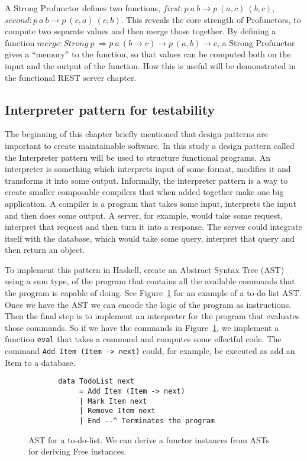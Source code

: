 A Strong Profunctor defines two functions, $first : p\ a\ b\rightarrow p\ (a,c)\
(b,c)$, $second : p\ a\ b\rightarrow p\ (c,a)\ (c,b)$. This reveals the core
strength of Profunctors, to compute two separate values and then merge those
together. By defining a function $merge : Strong\ p\ \Rightarrow p\ a\ (b
\rightarrow c) \rightarrow p\ (a,b) \rightarrow c$, a Strong Profunctor gives a
``memory'' to the function, so that values can be computed both on the input and
the output of the function. How this is useful will be demonstrated in the
functional REST server chapter.

\subsection{Interpreter pattern for testability}\label{interpreterpattern}

The beginning of this chapter briefly mentioned that design patterns are
important to create maintainable software.  In this study a design pattern
called the Interpreter pattern will be used to structure functional programs. An
interpreter is something which interprets input of some format, modifies it and
transforms it into some output.  Informally, the interpreter pattern is a way to
create smaller composable compilers that when added together make one big
application. A compiler is a program that takes some input, interprets the input
and then does some output. A server, for example, would take some request,
interpret that request and then turn it into a response. The server could
integrate itself with the database, which would take some query, interpret that
query and then return an object.~\cite{interpreterpattern}

To implement this pattern in Haskell, create an Abstract Syntax Tree (AST) using
a sum type, of the program that contains all the available commands that the
program is capable of doing. See Figure~\ref{freeunion} for an example of a
to-do list AST. Once we have the AST we can encode the logic of the program as
instructions. Then the final step is to implement an interpreter for the program
that evaluates those commands. So if we have the commands in
Figure~\ref{freeunion}, we implement a function \texttt{eval} that takes a
command and computes some effectful code.  The command \texttt{Add Item (Item ->
next)} could, for example, be executed as add an Item to a database.

\begin{figure}[H]
    \begin{lstlisting}
       data TodoList next
            = Add Item (Item -> next)
            | Mark Item next
            | Remove Item next
            | End --^ Terminates the program
    \end{lstlisting}
    \caption{AST for a to-do-list. We can derive a functor instances
    from ASTs for deriving Free instances.~\cite{commentarycompiler}}
    \label{freeunion}
\end{figure}


